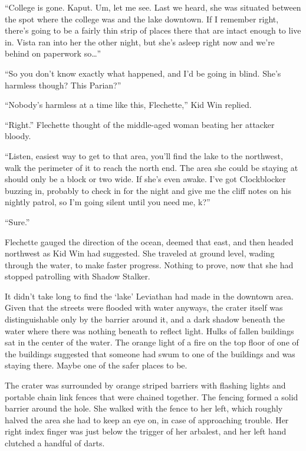 ``College is gone.  Kaput.  Um, let me see.  Last we heard, she was situated between the spot where the college was and the lake downtown.  If I remember right, there's going to be a fairly thin strip of places there that are intact enough to live in.  Vista ran into her the other night, but she's asleep right now and we're behind on paperwork so\ldots''



``So you don't know exactly what happened, and I'd be going in blind.  She's harmless though?  This Parian?''



``Nobody's harmless at a time like this, Flechette,'' Kid Win replied.



``Right.''  Flechette thought of the middle-aged woman beating her attacker bloody.



``Listen, easiest way to get to that area, you'll find the lake to the northwest, walk the perimeter of it to reach the north end.  The area she could be staying at should only be a block or two wide.  If she's even awake.  I've got Clockblocker buzzing in, probably to check in for the night and give me the cliff notes on his nightly patrol, so I'm going silent until you need me, k?''



``Sure.''



Flechette gauged the direction of the ocean, deemed that east, and then headed northwest as Kid Win had suggested.  She traveled at ground level, wading through the water, to make faster progress.  Nothing to prove, now that she had stopped patrolling with Shadow Stalker.



It didn't take long to find the `lake' Leviathan had made in the downtown area.  Given that the streets were flooded with water anyways, the crater itself was distinguishable only by the barrier around it, and a dark shadow beneath the water where there was nothing beneath to reflect light.  Hulks of fallen buildings sat in the center of the water.  The orange light of a fire on the top floor of one of the buildings suggested that someone had swum to one of the buildings and was staying there.  Maybe one of the safer places to be.



The crater was surrounded by orange striped barriers with flashing lights and portable chain link fences that were chained together.   The fencing formed a solid barrier around the hole.  She walked with the fence to her left, which roughly halved the area she had to keep an eye on, in case of approaching trouble.  Her right index finger was just below the trigger of her arbalest, and her left hand clutched a handful of darts.



